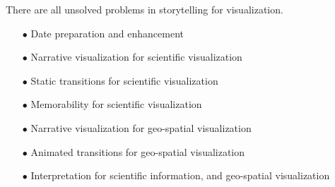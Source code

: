 \documentclass{egpubl}
\begin{document}
There are all unsolved problems in storytelling for visualization.
\begin{enumerate}
\item[$\bullet$] Date preparation and enhancement
\item[$\bullet$] Narrative visualization for scientific visualization	
\item[$\bullet$] Static transitions for scientific visualization
\item[$\bullet$] Memorability for scientific visualization
\item[$\bullet$] Narrative visualization for geo-spatial visualization
\item[$\bullet$] Animated transitions for geo-spatial visualization
\item[$\bullet$] Interpretation for scientific information, and geo-spatial visualization
\end{enumerate}


\newpage
%



\end{document}
